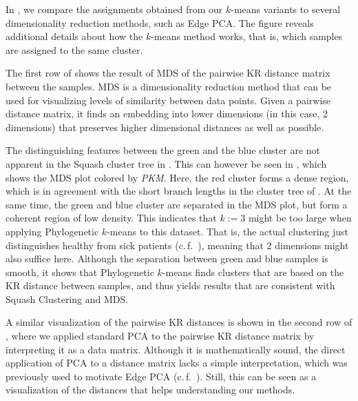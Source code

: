 In , we compare the assignments obtained from our $k$-means variants
to several dimensionality reduction methods, such as Edge PCA.
The figure reveals additional details about how the $k$-means method works,
that is, which samples are assigned to the same cluster.

The first row of  shows the result of
\acf{MDS} of the pairwise KR distance matrix between the samples.
\ac{MDS} \cite{Mardia1978,Krzanowski1994,Everitt2010} is a dimensionality reduction method that
can be used for visualizing levels of similarity between data points.
Given a pairwise distance matrix, it finds an embedding into lower dimensions (in this case, \num{2} dimensions)
that preserves higher dimensional distances as well as possible.

The distinguishing features between the green and the blue cluster
are not apparent in the Squash cluster tree in .
This can however be seen in , which shows the \ac{MDS} plot colored by \emph{PKM}.
Here, the red cluster forms a dense region, which is in agreement with the short branch lengths
in the cluster tree of .
At the same time, the green and blue cluster are separated in the \ac{MDS} plot,
but form a coherent region of low density.
This indicates that $k:=3$ might be too large when applying Phylogenetic $k$-means to this dataset.
That is, the actual clustering just distinguishes healthy from sick patients (c.\,f.~),
meaning that \num{2} dimensions might also suffice here.
Although the separation between green and blue samples is smooth,
it shows that Phylogenetic $k$-means finds clusters that are based on the KR distance between samples,
and thus yields results that are consistent with Squash Clustering and \ac{MDS}.

A similar visualization of the pairwise KR distances is shown in the second row of ,
where we applied standard \acf{PCA} \cite{Krzanowski1994,Everitt2010} to the pairwise KR distance matrix
by interpreting it as a data matrix.
Although it is mathematically sound, the direct application of \ac{PCA} to a distance matrix lacks a simple interpretation,
which was previously used to motivate Edge PCA
(c.\,f.~).
Still, this can be seen as a visualization of the distances that helps understanding our methods.

